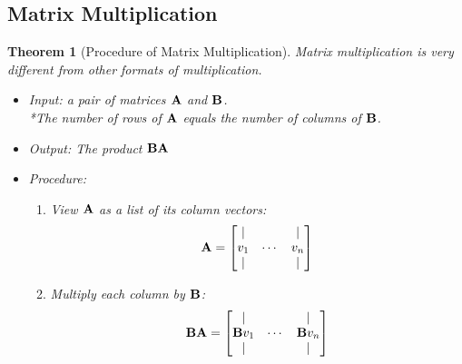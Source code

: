 \documentclass[12pt, a4paper]{article}
\newtheorem{thm}{Theorem}[subsection]
\def\matrixA{\vb{A}}
\def\matrixB{\vb{B}}
\begin{document}
\subsection{Matrix Multiplication}
\begin{thm}[Procedure of Matrix Multiplication]
Matrix multiplication is very different from other formats of multiplication.
\begin{itemize}
	\item Input: a pair of matrices $\matrixA$ and $\matrixB$. \\
	*The number of rows of $\matrixA$ equals the number of columns of $\matrixB$.
	\item Output: The product $\matrixB\matrixA$
	\item Procedure: 
	\begin{enumerate}
		\item View $\matrixA$ as a list of its column vectors: 
		\[\matrixA=\begin{bmatrix}|& &|\\v_1&\cdots &v_n\\|& &|\end{bmatrix}\]
		\item Multiply each column by $\matrixB$: 
		\[\matrixB\matrixA =\begin{bmatrix}|& &|\\\matrixB v_1&\cdots &\matrixB v_n\\|& &|\end{bmatrix}\]
	\end{enumerate}
\end{itemize}	
\end{thm}
\end{document}
